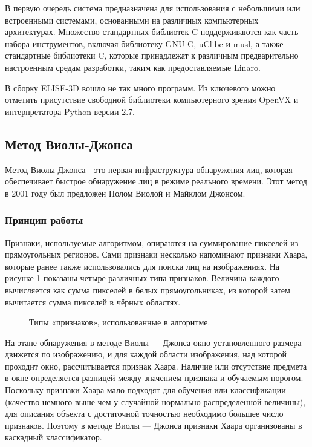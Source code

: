 \documentclass[12pt,a4paper]{scrartcl}
\begin{document}
		В первую очередь система предназначена для использования с небольшими или встроенными системами, основанными на различных компьютерных архитектурах. Множество стандартных библиотек C поддерживаются как часть набора инструментов, включая библиотеку GNU C, uClibc и musl, а также стандартные библиотеки C, которые принадлежат к различным предварительно настроенным средам разработки, таким как предоставляемые Linaro\cite{bib:Buildroot_Wikipedia}. 
		
		В сборку ELISE-3D вошло не так много программ. Из ключевого можно отметить присутствие свободной библиотеки компьютерного зрения OpenVX и интерпретатора Python версии 2.7.
		
	\subsection{Метод Виолы-Джонса}
	
		Метод Виолы-Джонса - это первая инфраструктура обнаружения лиц, которая обеспечивает быстрое обнаружение лиц в режиме реального времени. Этот метод в 2001 году был предложен Полом Виолой и Майклом Джонсом\cite{bib:Viola-Jones_Wikipedia}.
	
		\subsubsection{Принцип работы}
		
			Признаки, используемые алгоритмом, опираются на суммирование пикселей из прямоугольных регионов. Сами признаки несколько напоминают признаки Хаара, которые ранее также использовались для поиска лиц на изображениях. На рисунке \ref{fig:Viola-Jones_types} показаны четыре различных типа признаков. Величина каждого вычисляется как сумма пикселей в белых прямоугольниках, из которой затем вычитается сумма пикселей в чёрных областях\cite{bib:Viola-Jones_Wikipedia_Ru}.
			
			\begin{figure}[h]
				\caption{Типы «признаков», использованные в алгоритме.}
				\label{fig:Viola-Jones_types}
			\end{figure}
		
			На этапе обнаружения в методе Виолы — Джонса окно установленного размера движется по изображению, и для каждой области изображения, над которой проходит окно, рассчитывается признак Хаара. Наличие или отсутствие предмета в окне определяется разницей между значением признака и обучаемым порогом. Поскольку признаки Хаара мало подходят для обучения или классификации (качество немного выше чем у случайной нормально распределенной величины), для описания объекта с достаточной точностью необходимо большее число признаков. Поэтому в методе Виолы — Джонса признаки Хаара организованы в каскадный классификатор\cite{bib:Haar_Wikipedia}.
			
\end{document}
